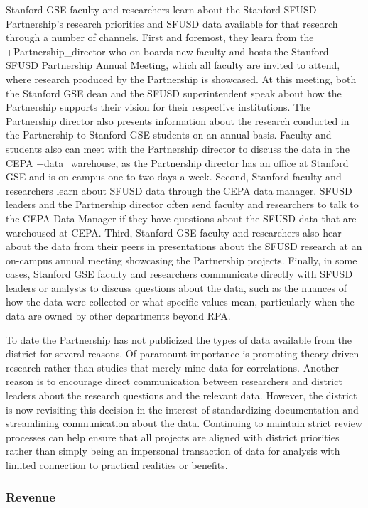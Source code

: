 \documentclass[
]{WileySix}
\begin{document}
Stanford GSE faculty and researchers learn about the Stanford-SFUSD Partnership's research priorities and SFUSD data available for that research through a number of channels. First and foremost, they learn from the +Partnership\_director\textbar{} who on-boards new faculty and hosts the Stanford-SFUSD Partnership Annual Meeting, which all faculty are invited to attend, where research produced by the Partnership is showcased. At this meeting, both the Stanford GSE dean and the SFUSD superintendent speak about how the Partnership supports their vision for their respective institutions. The Partnership director also presents information about the research conducted in the Partnership to Stanford GSE students on an annual basis. Faculty and students also can meet with the Partnership director to discuss the data in the CEPA +data\_warehouse\textbar, as the Partnership director has an office at Stanford GSE and is on campus one to two days a week. Second, Stanford faculty and researchers learn about SFUSD data through the CEPA data manager. SFUSD leaders and the Partnership director often send faculty and researchers to talk to the CEPA Data Manager if they have questions about the SFUSD data that are warehoused at CEPA. Third, Stanford GSE faculty and researchers also hear about the data from their peers in presentations about the SFUSD research at an on-campus annual meeting showcasing the Partnership projects. Finally, in some cases, Stanford GSE faculty and researchers communicate directly with SFUSD leaders or analysts to discuss questions about the data, such as the nuances of how the data were collected or what specific values mean, particularly when the data are owned by other departments beyond RPA.

To date the Partnership has not publicized the types of data available from the district for several reasons. Of paramount importance is promoting theory-driven research rather than studies that merely mine data for correlations. Another reason is to encourage direct communication between researchers and district leaders about the research questions and the relevant data. However, the district is now revisiting this decision in the interest of standardizing documentation and streamlining communication about the data. Continuing to maintain strict review processes can help ensure that all projects are aligned with district priorities rather than simply being an impersonal transaction of data for analysis with limited connection to practical realities or benefits.

\hypertarget{revenue-4}{%
\subsubsection{Revenue}\label{revenue-4}}
\end{document}
